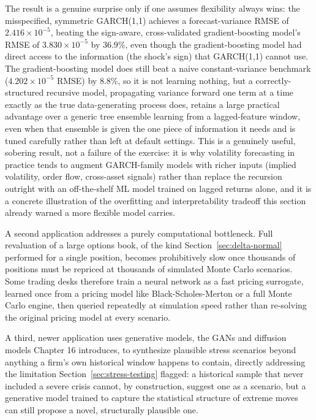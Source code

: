 \documentclass[../ai_in_finance]{subfiles}
\begin{document}
The result is a genuine surprise only if one assumes flexibility always wins: the misspecified, symmetric GARCH(1,1) achieves a forecast-variance RMSE of $2.416\times10^{-5}$, beating the sign-aware, cross-validated gradient-boosting model's RMSE of $3.830\times10^{-5}$ by $36.9\%$, even though the gradient-boosting model had direct access to the information (the shock's sign) that GARCH(1,1) cannot use.
The gradient-boosting model does still beat a naive constant-variance benchmark ($4.202\times10^{-5}$ RMSE) by $8.8\%$, so it is not learning nothing, but a correctly-structured recursive model, propagating variance forward one term at a time exactly as the true data-generating process does, retains a large practical advantage over a generic tree ensemble learning from a lagged-feature window, even when that ensemble is given the one piece of information it needs and is tuned carefully rather than left at default settings.
This is a genuinely useful, sobering result, not a failure of the exercise: it is why volatility forecasting in practice tends to augment GARCH-family models with richer inputs (implied volatility, order flow, cross-asset signals) rather than replace the recursion outright with an off-the-shelf ML model trained on lagged returns alone, and it is a concrete illustration of the overfitting and interpretability tradeoff this section already warned a more flexible model carries.

A second application addresses a purely computational bottleneck. Full revaluation of a large options book, of the kind Section~\ref{sec:delta-normal} performed for a single position, becomes prohibitively slow once thousands of positions must be repriced at thousands of simulated Monte Carlo scenarios. Some trading desks therefore train a neural network as a fast pricing surrogate, learned once from a pricing model like Black-Scholes-Merton or a full Monte Carlo engine, then queried repeatedly at simulation speed rather than re-solving the original pricing model at every scenario.

A third, newer application uses generative models, the GANs and diffusion models Chapter 16 introduces, to synthesize plausible stress scenarios beyond anything a firm's own historical window happens to contain, directly addressing the limitation Section~\ref{sec:stress-testing} flagged: a historical sample that never included a severe crisis cannot, by construction, suggest one as a scenario, but a generative model trained to capture the statistical structure of extreme moves can still propose a novel, structurally plausible one.
\end{document}
